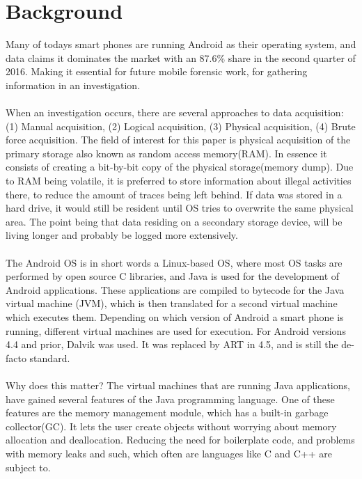 \section{Background}
\label{background}
Many of todays smart phones are running Android as their operating system, and data claims it dominates the market with an 87.6\% share in the second quarter of 2016\cite{idc}. Making it essential for future mobile forensic work, for gathering information in an investigation.\\
\\
When an investigation occurs, there are several approaches to data acquisition: (1) Manual acquisition, (2) Logical acquisition, (3) Physical acquisition, (4) Brute force acquisition. The field of interest for this paper is physical acquisition of the primary storage also known as random access memory(RAM). In essence it consists of creating a bit-by-bit copy of the physical storage(memory dump). Due to RAM being volatile, it is preferred to store information about illegal activities there, to reduce the amount of traces being left behind. If data was stored in a hard drive, it would still be resident until OS tries to overwrite the same physical area. The point being that data residing on a secondary storage device, will be living longer and probably be logged more extensively.\\
\\
The Android OS is in short words a Linux-based OS, where most OS tasks are performed by open source C libraries, and Java is used for the development of Android applications. These applications are compiled to bytecode for the Java virtual machine (JVM), which is then translated for a second virtual machine which executes them. Depending on which version of Android a smart phone is running, different virtual machines are used for execution.
For Android versions 4.4 and prior, Dalvik was used. It was replaced by ART in 4.5, and is still the de-facto standard.\\
\\
Why does this matter? The virtual machines that are running Java applications, have gained several features of the Java programming language. One of these features are the memory management module, which has a built-in garbage collector(GC). It lets the user create objects without worrying about memory allocation and deallocation. Reducing the need for boilerplate code, and problems with memory leaks and such, which often are languages like C and C++ are subject to. \\
